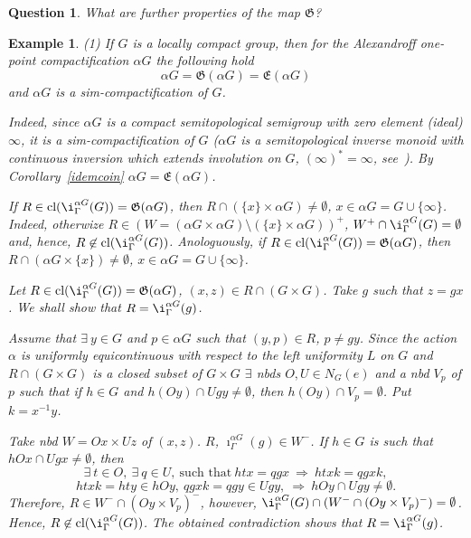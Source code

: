\documentclass{amsart}
\newtheorem{ex}[thm]{Example}
\newtheorem{que}[thm]{Question}
\newcommand{\cl}{\mbox{{\rm cl}}}
\begin{document}
\begin{que}
What are further properties of the map $\mathfrak{G}$?
\end{que}

\begin{ex}
{\rm (1) If $G$ is a locally compact group, then for the Alexandroff one-point compactification $\alpha G$ the following hold 
$$\alpha G=\mathfrak{G}(\alpha G)=\mathfrak{E}(\alpha G)$$
and $\alpha G$ is a sim-compactification of $G$.

Indeed, since $\alpha G$ is a compact semitopological semigroup with zero element (ideal) $\infty$, it is a sim-compactification of $G$ ($\alpha G$ is a semitopological inverse monoid with continuous inversion which extends involution on $G$, $(\infty)^*=\infty$, see~\cite{Sain}). By Corollary~\ref{idemcoin} $\alpha G=\mathfrak{E}(\alpha G)$. 

If $R\in\cl (\i^{\alpha G}_{\Gamma} (G))=\mathfrak{G}(\alpha G)$, then $R\cap(\{x\}\times\alpha G)\ne\emptyset$, $x\in\alpha G=G\cup\{\infty\}$. Indeed, otherwize $R\in (W=(\alpha G\times\alpha G)\setminus(\{x\}\times\alpha G))^+$, $W^+\cap\i^{\alpha G}_{\Gamma} (G)=\emptyset$ and, hence, $R\not\in\cl (\i^{\alpha G}_{\Gamma} (G))$. Anologuously, if $R\in\cl (\i^{\alpha G}_{\Gamma} (G))=\mathfrak{G}(\alpha G)$, then $R\cap(\alpha G\times \{x\})\ne\emptyset$, $x\in\alpha G=G\cup\{\infty\}$. 

Let $R\in\cl (\i^{\alpha G}_{\Gamma} (G))=\mathfrak{G}(\alpha G)$, $(x, z)\in R\cap (G\times G)$. Take $g$ such that $z=gx$. We shall show that $R=\i^{\alpha G}_{\Gamma} (g)$. 

Assume that $\exists\ y\in G$ and $p\in\alpha G$ such that $(y, p)\in R$, $p\ne gy$. Since the action $\alpha$ is uniformly equicontinuous with respect to the left uniformity $L$ on $G$ and $R\cap (G\times G)$ is a closed subset of $G\times G$ $\exists$ nbds $O, U\in N_G(e)$ and a nbd $V_p$ of $p$ such that if $h\in G$ and $h(Oy)\cap Ugy\ne\emptyset$, then $h(Oy)\cap V_p=\emptyset$. Put $k=x^{-1}y$. 

Take nbd $W=Ox\times Uz$ of $(x, z)$. $R$, $\imath^{\alpha G}_{\Gamma} (g)\in W^-$. If $h\in G$ is such that $hOx\cap Ugx\ne\emptyset$, then 
$$\exists\ t\in O,\ \exists\ q\in U,\ \mbox{such that}\ htx=qgx\ \Longrightarrow\ htxk=qgxk,$$
$$htxk=hty\in hOy,\ qgxk=qgy\in Ugy,\ \Longrightarrow\ hOy\cap Ugy\ne\emptyset.$$
Therefore, $R\in W^-\cap (Oy\times V_p)^-$, however, $\i^{\alpha G}_{\Gamma} (G)\cap (W^-\cap (Oy\times V_p)^-)=\emptyset$. Hence, $R\not\in\cl (\i^{\alpha G}_{\Gamma} (G))$. The obtained contradiction shows that $R=\i^{\alpha G}_{\Gamma} (g)$. 

}
\end{ex}
\end{document}
